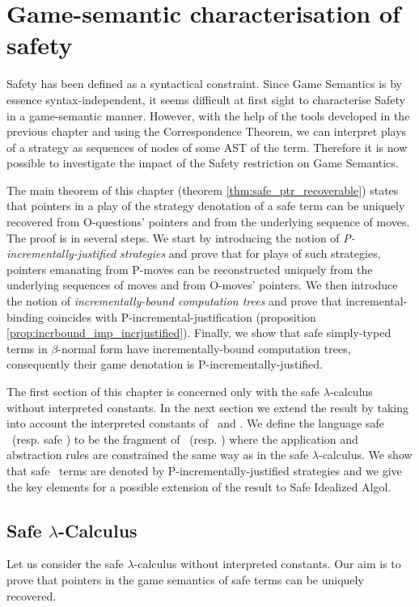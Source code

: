 \chapter{Game-semantic characterisation of safety}

Safety has been defined as a syntactical constraint. Since Game
Semantics is by essence syntax-independent, it seems difficult at
first sight to characterise Safety in a game-semantic manner.
However, with the help of the tools developed in the previous
chapter and using the Correspondence Theorem, we can interpret plays
of a strategy as sequences of nodes of some AST of the term.
Therefore it is now possible to investigate the impact of the Safety
restriction on Game Semantics.


The main theorem of this chapter (theorem
\ref{thm:safe_ptr_recoverable}) states that pointers in a play of
the strategy denotation of a safe term can be uniquely recovered
from O-questions' pointers and from the underlying sequence of moves. The proof is in several steps. We start by introducing the notion of
\emph{P-incrementally-justified strategies} and prove that for plays
of such strategies, pointers emanating from P-moves can be reconstructed uniquely from the underlying sequences of moves and from O-moves' pointers. We then introduce the notion of \emph{incrementally-bound computation trees} and prove that incremental-binding coincides with P-incremental-justification (proposition \ref{prop:incrbound_imp_incrjustified}). Finally, we show that safe simply-typed terms in $\beta$-normal form have incrementally-bound computation trees, consequently their game denotation is P-incrementally-justified.


The first section of this chapter is concerned only with the safe $\lambda$-calculus without interpreted constants. In the next
section we extend the result by taking into account the interpreted
constants of \pcf\ and \ialgol. We define the language safe \ialgol\
(resp. safe \pcf) to be the fragment of \ialgol\ (resp. \pcf) where
the application and abstraction rules are constrained the same way
as in the safe $\lambda$-calculus. We show that safe \pcf\ terms are
denoted by P-incrementally-justified strategies and we give the key
elements for a possible extension of the result to Safe Idealized
Algol.

\section{Safe $\lambda$-Calculus}
Let us consider the safe $\lambda$-calculus without interpreted
constants. Our aim is to prove that pointers in the game semantics
of safe terms can be uniquely recovered.


